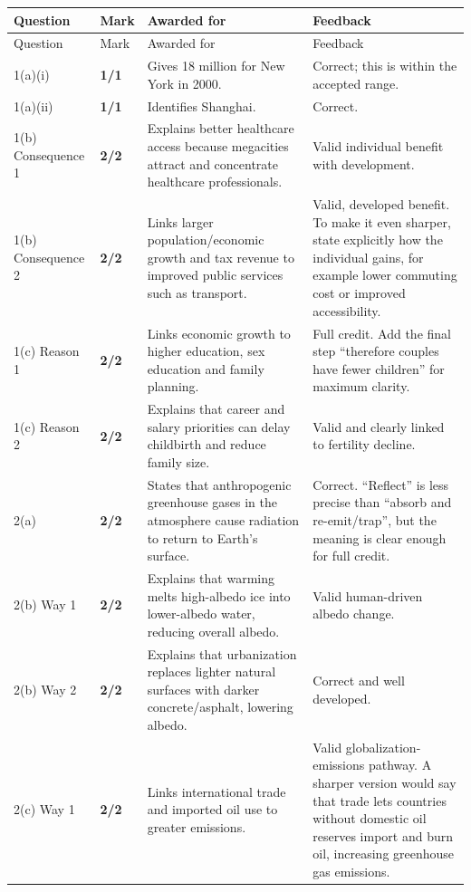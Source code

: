 \documentclass[11pt]{article}
\newcommand{\markcell}[2]{\textbf{#1/#2}}
\begin{document}
\begin{longtable}{@{}p{} p{} p{} p{}@{}}
\toprule
Question & Mark & Awarded for & Feedback \\
\midrule
\endfirsthead
\toprule
Question & Mark & Awarded for & Feedback \\
\midrule
\endhead
1(a)(i) & \markcell{1}{1} & Gives 18 million for New York in 2000. & Correct; this is within the accepted range. \\
1(a)(ii) & \markcell{1}{1} & Identifies Shanghai. & Correct. \\
1(b) Consequence 1 & \markcell{2}{2} & Explains better healthcare access because megacities attract and concentrate healthcare professionals. & Valid individual benefit with development. \\
1(b) Consequence 2 & \markcell{2}{2} & Links larger population/economic growth and tax revenue to improved public services such as transport. & Valid, developed benefit. To make it even sharper, state explicitly how the individual gains, for example lower commuting cost or improved accessibility. \\
1(c) Reason 1 & \markcell{2}{2} & Links economic growth to higher education, sex education and family planning. & Full credit. Add the final step ``therefore couples have fewer children'' for maximum clarity. \\
1(c) Reason 2 & \markcell{2}{2} & Explains that career and salary priorities can delay childbirth and reduce family size. & Valid and clearly linked to fertility decline. \\
\midrule
2(a) & \markcell{2}{2} & States that anthropogenic greenhouse gases in the atmosphere cause radiation to return to Earth's surface. & Correct. ``Reflect'' is less precise than ``absorb and re-emit/trap'', but the meaning is clear enough for full credit. \\
2(b) Way 1 & \markcell{2}{2} & Explains that warming melts high-albedo ice into lower-albedo water, reducing overall albedo. & Valid human-driven albedo change. \\
2(b) Way 2 & \markcell{2}{2} & Explains that urbanization replaces lighter natural surfaces with darker concrete/asphalt, lowering albedo. & Correct and well developed. \\
2(c) Way 1 & \markcell{2}{2} & Links international trade and imported oil use to greater emissions. & Valid globalization-emissions pathway. A sharper version would say that trade lets countries without domestic oil reserves import and burn oil, increasing greenhouse gas emissions. \\

\end{longtable}
\end{document}
